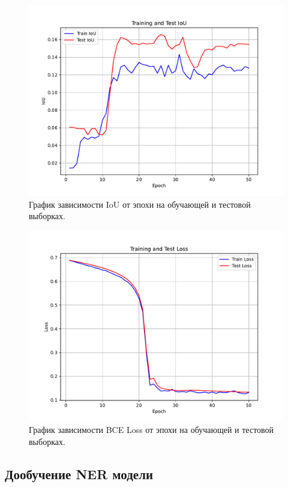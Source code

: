 \documentclass[12pt]{article}
\begin{document}
\begin{figure}[h]
    \centering
    \includegraphics[width=\textwidth]{images/iou_plot (1).pdf}
    \caption{График зависимости IoU от эпохи на обучающей и тестовой выборках.}
    \label{fig:ious_train}
\end{figure}
\begin{figure}[h]
    \centering
    \includegraphics[width=\textwidth]{images/loss_plot (1).pdf}
    \caption{График зависимости BCE Loss от эпохи на обучающей и тестовой выборках.}
    \label{fig:loss_train}
\end{figure}

 \subsection{Дообучение  NER модели}
\end{document}

